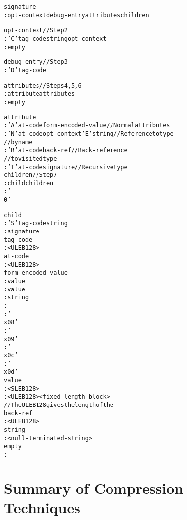 \begin{alltt}
signature
    : opt-context debug-entry attributes children

opt-context           // Step 2
    : 'C' tag-code string opt-context
    : empty

debug-entry           // Step 3
    : 'D' tag-code

attributes            // Steps 4, 5, 6
    : attribute attributes
    : empty

attribute
    : 'A' at-code form-encoded-value     // Normal attributes
    : 'N' at-code opt-context 'E' string // Reference to type
                                         // by name
    : 'R' at-code back-ref               // Back-reference 
                                         // to visited type
    : 'T' at-code signature              // Recursive type
children             //  Step 7
    : child children
    : '\\0'

child
    : 'S' tag-code string
    : signature
tag-code
    : <ULEB128>
at-code
    : <ULEB128>
form-encoded-value
    :  value 
    :  value 
    :  string 
    :   
 
    : '\\x08'
  
    : '\\x09'
 
    : '\\x0c'
 
    : '\\x0d'
value
    : <SLEB128>
    : <ULEB128> <fixed-length-block>
                      // The ULEB128 gives the length of the 
back-ref
    : <ULEB128>
string
    : <null-terminated-string>
empty
    :
\end{alltt}


\section{Summary of Compression Techniques}
\label{app:summaryofcompressiontechniques}
